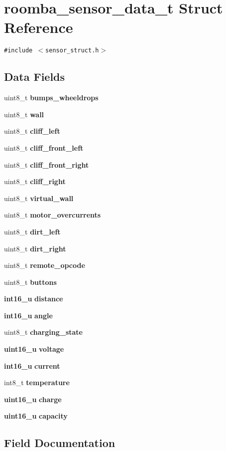 \section{roomba\_\-sensor\_\-data\_\-t Struct Reference}
\label{structroomba__sensor__data__t}
{\tt \#include $<$sensor\_\-struct.h$>$}

\subsection*{Data Fields}
\begin{CompactItemize}
\item 
uint8\_\-t {\bf bumps\_\-wheeldrops}
\item 
uint8\_\-t {\bf wall}
\item 
uint8\_\-t {\bf cliff\_\-left}
\item 
uint8\_\-t {\bf cliff\_\-front\_\-left}
\item 
uint8\_\-t {\bf cliff\_\-front\_\-right}
\item 
uint8\_\-t {\bf cliff\_\-right}
\item 
uint8\_\-t {\bf virtual\_\-wall}
\item 
uint8\_\-t {\bf motor\_\-overcurrents}
\item 
uint8\_\-t {\bf dirt\_\-left}
\item 
uint8\_\-t {\bf dirt\_\-right}
\item 
uint8\_\-t {\bf remote\_\-opcode}
\item 
uint8\_\-t {\bf buttons}
\item 
{\bf int16\_\-u} {\bf distance}
\item 
{\bf int16\_\-u} {\bf angle}
\item 
uint8\_\-t {\bf charging\_\-state}
\item 
{\bf uint16\_\-u} {\bf voltage}
\item 
{\bf int16\_\-u} {\bf current}
\item 
int8\_\-t {\bf temperature}
\item 
{\bf uint16\_\-u} {\bf charge}
\item 
{\bf uint16\_\-u} {\bf capacity}
\end{CompactItemize}


\subsection{Field Documentation}
